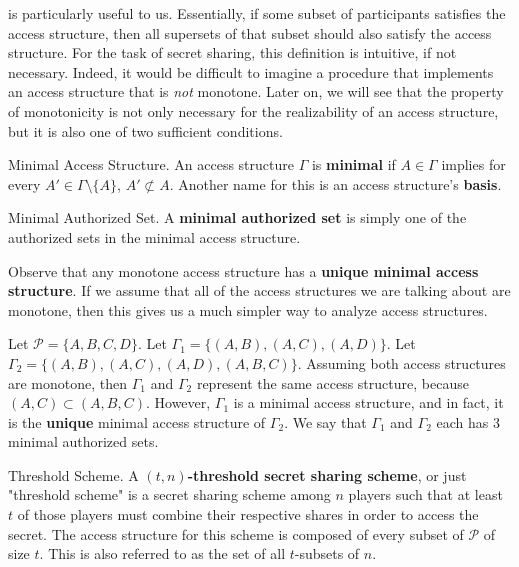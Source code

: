  is particularly useful to us. Essentially, if some subset of participants satisfies the access structure, then all supersets of that subset should also satisfy the access structure. For the task of secret sharing, this definition is intuitive, if not necessary. Indeed, it would be difficult to imagine a procedure that implements an access structure that is \textit{not} monotone. Later on, we will see that the property of monotonicity is not only necessary for the realizability of an access structure, but it is also one of two sufficient conditions.


\theoremstyle{definition}
\begin{definition}{Minimal Access Structure.}
    \label{defn:minimal-as}
    An access structure $\Gamma$ is \textbf{minimal} if $A \in \Gamma$ implies for every $A' \in \Gamma \setminus \{A\}$, $A' \not\subset A$. Another name for this is an access structure's \textbf{basis}.
\end{definition}

\theoremstyle{definition}
\begin{definition}{Minimal Authorized Set.}
    \label{defn:minimal-authorized-set}
    A \textbf{minimal authorized set} is simply one of the authorized sets in the minimal access structure.
\end{definition}

Observe that any monotone access structure has a \textbf{unique minimal access structure}. If we assume that all of the access structures we are talking about are monotone, then this gives us a much simpler way to analyze access structures.

\begin{example}
    Let $\mathcal{P} = \{A,B,C,D\}$. Let $\Gamma_1 = \{(A,B), (A,C), (A,D)\}$. Let $\Gamma_2 = \{(A,B), (A,C), (A,D), (A,B,C)\}$. Assuming both access structures are monotone, then $\Gamma_1$ and $\Gamma_2$ represent the same access structure, because $(A,C) \subset (A,B,C)$. However, $\Gamma_1$ is a minimal access structure, and in fact, it is the \textbf{unique} minimal access structure of $\Gamma_2$. We say that $\Gamma_1$ and $\Gamma_2$ each has 3 minimal authorized sets.
\end{example}


\theoremstyle{definition}
\begin{definition}{Threshold Scheme.}
    \label{defn:threshold-scheme}
    A \textbf{$(t,n)$-threshold secret sharing scheme}, or just "threshold scheme" is a secret sharing scheme among $n$ players such that at least $t$ of those players must combine their respective shares in order to access the secret. The access structure for this scheme is composed of every subset of $\mathcal{P}$ of size $t$. This is also referred to as the set of all $t$-subsets of $n$.
\end{definition}


